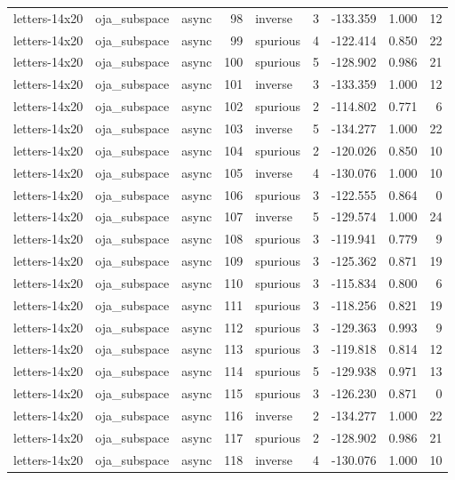 \begin{tabular}{lllrlrrrr}
letters-14x20 & oja\_subspace & async & 98 & inverse & 3 & -133.359 & 1.000 & 12 \\
letters-14x20 & oja\_subspace & async & 99 & spurious & 4 & -122.414 & 0.850 & 22 \\
letters-14x20 & oja\_subspace & async & 100 & spurious & 5 & -128.902 & 0.986 & 21 \\
letters-14x20 & oja\_subspace & async & 101 & inverse & 3 & -133.359 & 1.000 & 12 \\
letters-14x20 & oja\_subspace & async & 102 & spurious & 2 & -114.802 & 0.771 & 6 \\
letters-14x20 & oja\_subspace & async & 103 & inverse & 5 & -134.277 & 1.000 & 22 \\
letters-14x20 & oja\_subspace & async & 104 & spurious & 2 & -120.026 & 0.850 & 10 \\
letters-14x20 & oja\_subspace & async & 105 & inverse & 4 & -130.076 & 1.000 & 10 \\
letters-14x20 & oja\_subspace & async & 106 & spurious & 3 & -122.555 & 0.864 & 0 \\
letters-14x20 & oja\_subspace & async & 107 & inverse & 5 & -129.574 & 1.000 & 24 \\
letters-14x20 & oja\_subspace & async & 108 & spurious & 3 & -119.941 & 0.779 & 9 \\
letters-14x20 & oja\_subspace & async & 109 & spurious & 3 & -125.362 & 0.871 & 19 \\
letters-14x20 & oja\_subspace & async & 110 & spurious & 3 & -115.834 & 0.800 & 6 \\
letters-14x20 & oja\_subspace & async & 111 & spurious & 3 & -118.256 & 0.821 & 19 \\
letters-14x20 & oja\_subspace & async & 112 & spurious & 3 & -129.363 & 0.993 & 9 \\
letters-14x20 & oja\_subspace & async & 113 & spurious & 3 & -119.818 & 0.814 & 12 \\
letters-14x20 & oja\_subspace & async & 114 & spurious & 5 & -129.938 & 0.971 & 13 \\
letters-14x20 & oja\_subspace & async & 115 & spurious & 3 & -126.230 & 0.871 & 0 \\
letters-14x20 & oja\_subspace & async & 116 & inverse & 2 & -134.277 & 1.000 & 22 \\
letters-14x20 & oja\_subspace & async & 117 & spurious & 2 & -128.902 & 0.986 & 21 \\
letters-14x20 & oja\_subspace & async & 118 & inverse & 4 & -130.076 & 1.000 & 10 \\

\end{tabular}
